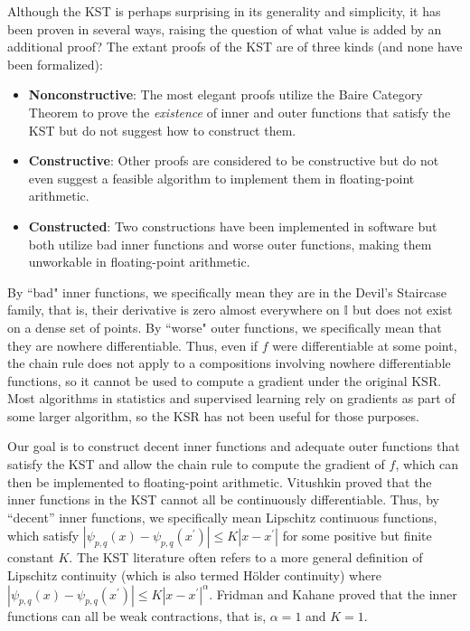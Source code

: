 Although the KST is perhaps surprising in its generality and simplicity, it has been proven in several ways, raising the question of what value is added by an additional proof? The extant proofs of the KST are of three kinds (and none have been formalized):

\begin{itemize}
    \item \textbf{Nonconstructive}: The most elegant proofs utilize the Baire Category Theorem to prove the \textit{existence} of inner and outer functions that satisfy the KST but do not suggest how to construct them.
    \item \textbf{Constructive}: Other proofs are considered to be constructive but do not even suggest a feasible algorithm to implement them in floating-point arithmetic.
    \item \textbf{Constructed}: Two constructions have been implemented in software but both utilize bad inner functions and worse outer functions, making them unworkable in floating-point arithmetic.
\end{itemize}

By ``bad" inner functions, we specifically mean they are in the Devil's Staircase family, that is, their derivative is zero almost everywhere on $\mathbb{I}$ but does not exist on a dense set of points. By ``worse" outer functions, we specifically mean that they are nowhere differentiable. Thus, even if $f$ were differentiable at some point, the chain rule does not apply to a compositions involving nowhere differentiable functions, so it cannot be used to compute a gradient under the original KSR. Most algorithms in statistics and supervised learning rely on gradients as part of some larger algorithm, so the KSR has not been useful for those purposes. 

Our goal is to construct decent inner functions and adequate outer functions that satisfy the KST and allow the chain rule to compute the gradient of $f$, which can then be implemented to floating-point arithmetic. Vitushkin proved that the inner functions in the KST cannot all be continuously differentiable. Thus, by ``decent'' inner functions, we specifically mean Lipschitz continuous functions, which satisfy $\left|\psi_{p,q}\left(x\right) - \psi_{p,q}\left(x^\prime\right)\right| \leq K\left|x - x^\prime\right|$ for some positive but finite constant $K$. The KST literature often refers to a more general definition of Lipschitz continuity (which is also termed H\"{o}lder continuity) where $\left|\psi_{p,q}\left(x\right) -   \psi_{p,q}\left(x^\prime\right)\right| \leq K\left|x - x^\prime\right|^\alpha$. Fridman and Kahane proved that the inner functions can all be weak contractions, that is, $\alpha = 1$ and $K = 1$.

